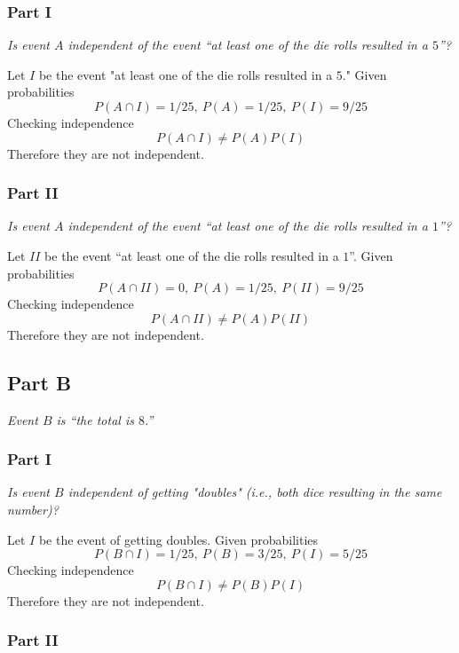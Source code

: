 \documentclass{article}
\begin{document}
\subsubsection*{Part I}

\textit{Is event $ A $ independent of the event “at least one of the die rolls
resulted in a $ 5 $”?}

\bigbreak

Let $ I $ be the event "at least one of the die rolls resulted in a $ 5 $."
Given probabilities
$$ P(A \cap I) = 1/25,\ P(A) = 1/25,\ P(I) = 9/25 $$
Checking independence
$$ P(A \cap I) \neq P(A) P(I) $$
Therefore they are not independent.

\subsubsection*{Part II}

\textit{Is event $ A $ independent of the event “at least one of the die rolls
resulted in a $ 1 $”?}

\bigbreak

Let $ II $ be the event “at least one of the die rolls resulted in a $ 1 $”.
Given probabilities
$$ P(A \cap II) = 0,\ P(A) = 1/25,\ P(II) = 9/25 $$
Checking independence
$$ P(A \cap II) \neq P(A) P(II) $$
Therefore they are not independent.

\subsection*{Part B}

\textit{Event $ B $ is “the total is $ 8 $.”}

\subsubsection*{Part I}

\textit{Is event $ B $ independent of getting "doubles" (i.e., both dice
resulting in the same number)?}

\bigbreak

Let $ I $ be the event of getting doubles. Given probabilities
$$ P(B \cap I) = 1/25,\ P(B) = 3/25,\ P(I) = 5/25 $$
Checking independence
$$ P(B \cap I) \neq P(B) P(I) $$
Therefore they are not independent.

\subsubsection*{Part II}
\end{document}
